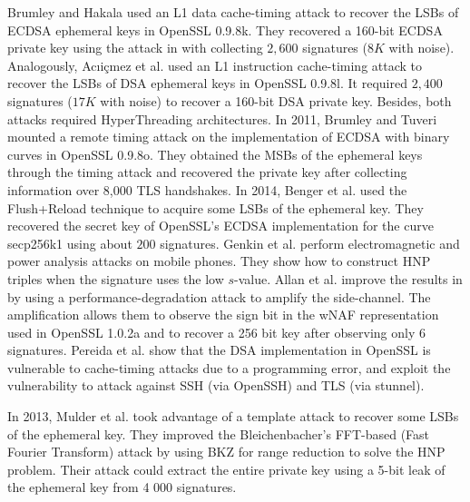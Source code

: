 Brumley and Hakala \cite{Brumley2009} used an L1 data cache-timing attack to recover the LSBs of ECDSA ephemeral keys in OpenSSL 0.9.8k.
 They recovered a 160-bit ECDSA private key using the attack in \cite{HG2001} with collecting $2,600$ signatures ($8K$ with noise).
Analogously, Ac{\i}i{\c{c}}mez et al. \cite{Brumley2010} used an L1 instruction cache-timing attack to recover the LSBs of DSA ephemeral keys in OpenSSL 0.9.8l.
 It required $2,400$ signatures ($17K$ with noise) to recover a 160-bit DSA private key.
 Besides, both attacks required HyperThreading architectures.
In 2011, Brumley and Tuveri \cite{Brumley2011} mounted a remote timing attack on the implementation of ECDSA with binary curves in OpenSSL 0.9.8o.
 They obtained the MSBs of the ephemeral keys through the timing attack and recovered the private key after collecting information over 8,000 TLS handshakes.
In 2014, Benger et al. \cite{Benger2014} used the Flush+Reload technique to acquire some LSBs of the ephemeral key.
 They recovered the secret key of OpenSSL's ECDSA implementation for the curve secp256k1 using about $200$ signatures.
Genkin et al. \cite{Genkin2016} perform electromagnetic and power analysis attacks on mobile phones. They show how to construct HNP triples when the signature uses the low $s$-value.
Allan et al. \cite{Allan2016} improve the  results in \cite{Van2015} by using a performance-degradation attack to amplify the side-channel. The amplification allows them to observe the sign bit in the wNAF representation used in OpenSSL 1.0.2a and to recover a 256 bit key after observing only 6 signatures.
Pereida et al. \cite{Pereida2016} show that the DSA implementation in OpenSSL is vulnerable to cache-timing attacks due to a programming error, and exploit the vulnerability to attack against SSH (via OpenSSH) and TLS (via stunnel).

In 2013, Mulder et al. \cite{Mulder2013} took advantage of a template attack to recover some LSBs of the ephemeral key.
They improved the Bleichenbacher’s FFT-based (Fast Fourier Transform) attack by using BKZ for range reduction to solve the HNP problem.
Their attack could extract the entire private key using a 5-bit leak of the ephemeral key from 4 000 signatures.









